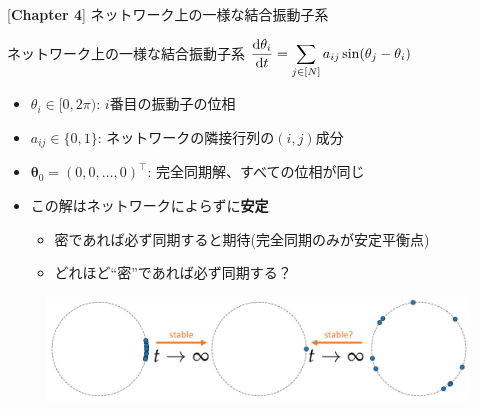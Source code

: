 \begin{frame}{[\textbf{Chapter 4}] ネットワーク上の一様な結合振動子系}
  \begin{block}{ネットワーク上の一様な結合振動子系}
  \centering
  $\displaystyle\frac{\mathrm{d}\theta_{i}}{\mathrm{d} t}=\sum_{j\in[N]}a_{ij}\sin(\theta_{j}-\theta_{i})$
  \begin{itemize}
    \item $\theta_{i}\in[0,2\pi)$: $i$番目の振動子の位相
    \item $a_{ij}\in\{0,1\}$: ネットワークの隣接行列の$(i,j)$成分
  \end{itemize}
  \end{block}
  \begin{itemize}
    \item $\bm{\theta}_{0}=(0,0,\dots,0)^{\top}$: 完全同期解、すべての位相が同じ
    \item この解はネットワークによらずに\textbf{安定}
    \begin{itemize}
        \item 密であれば必ず同期すると期待(完全同期のみが安定平衡点)
        \item どれほど``密''であれば必ず同期する？
    \end{itemize}
  \end{itemize}
  \begin{figure}
    \centering
    \includegraphics[width=\textwidth]{figs/dense_sync_ponchi.pdf}
  \end{figure}
\end{frame}

